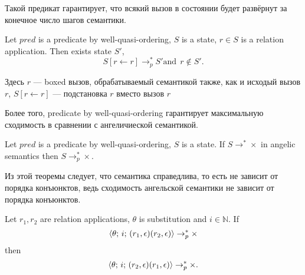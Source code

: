 \noindent Такой предикат гарантирует, что всякий вызов в состоянии будет развёрнут за конечное число шагов семантики. 

\begin{lemma}
Let $pred$ is a predicate by well-quasi-ordering, $S$ is a state, $r \in S$ is a relation application. Then exists state $S'$,
$$S[r \leftarrow \boxed{r}] \rightarrow_p^* S' \mbox{and}\;\, \boxed{r} \not\in S'.$$
\end{lemma}

\noindent Здесь $\boxed{r}$ --- boxed вызов, обрабатываемый семантикой также, как и исходый вызов $r$, $S[r \leftarrow \boxed{r}]$ --- подстановка $\boxed{r}$ вместо вызов $r$

Более того, predicate by well-quasi-ordering гарантирует максимальную сходимость в сравнении с ангеличиеской семантикой.

\begin{theorem}
Let $pred$ is a predicate by well-quasi-ordering, $S$ is a state.
If $S \rightarrow^* \times$ in angelic semantics then $S \rightarrow^*_p \times$.
\end{theorem}

Из этой теоремы следует, что семантика справедлива, то есть не зависит от порядка конъюнктов, ведь сходимость ангельской семантики не зависит от порядка конъюнктов.

\begin{corollary}
Let $r_1, r_2$ are relation applications, $\theta$ is substitution and $i \in \mathbb{N}$. If
$$\langle \theta;\, i;\, (r_1,\epsilon) (r_2,\epsilon) \rangle \rightarrow^*_p \times$$ 
then 
$$\langle \theta;\, i;\,(r_2,\epsilon) (r_1,\epsilon) \rangle \rightarrow^*_p \times.$$
\end{corollary}

